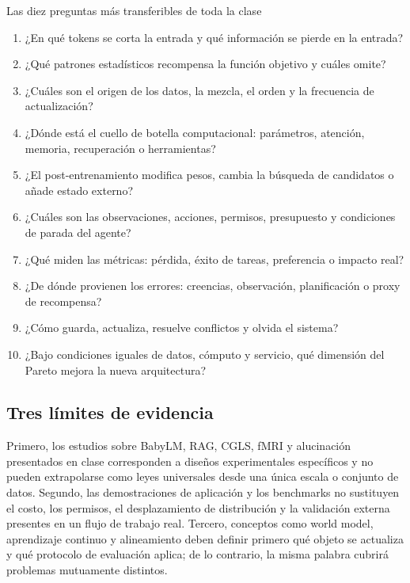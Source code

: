 \documentclass[a4paper]{article}
\begin{document}
\begin{importantbox}{Las diez preguntas más transferibles de toda la clase}
\begin{enumerate}
  \item ¿En qué tokens se corta la entrada y qué información se pierde en la entrada?
  \item ¿Qué patrones estadísticos recompensa la función objetivo y cuáles omite?
  \item ¿Cuáles son el origen de los datos, la mezcla, el orden y la frecuencia de actualización?
  \item ¿Dónde está el cuello de botella computacional: parámetros, atención, memoria, recuperación o herramientas?
  \item ¿El post-entrenamiento modifica pesos, cambia la búsqueda de candidatos o añade estado externo?
  \item ¿Cuáles son las observaciones, acciones, permisos, presupuesto y condiciones de parada del agente?
  \item ¿Qué miden las métricas: pérdida, éxito de tareas, preferencia o impacto real?
  \item ¿De dónde provienen los errores: creencias, observación, planificación o proxy de recompensa?
  \item ¿Cómo guarda, actualiza, resuelve conflictos y olvida el sistema?
  \item ¿Bajo condiciones iguales de datos, cómputo y servicio, qué dimensión del Pareto mejora la nueva arquitectura?
\end{enumerate}
\end{importantbox}

\subsection{Tres límites de evidencia}

Primero, los estudios sobre BabyLM, RAG, CGLS, fMRI y alucinación presentados en clase corresponden a diseños experimentales específicos y no pueden extrapolarse como leyes universales desde una única escala o conjunto de datos. Segundo, las demostraciones de aplicación y los benchmarks no sustituyen el costo, los permisos, el desplazamiento de distribución y la validación externa presentes en un flujo de trabajo real. Tercero, conceptos como world model, aprendizaje continuo y alineamiento deben definir primero qué objeto se actualiza y qué protocolo de evaluación aplica; de lo contrario, la misma palabra cubrirá problemas mutuamente distintos.
\end{document}
